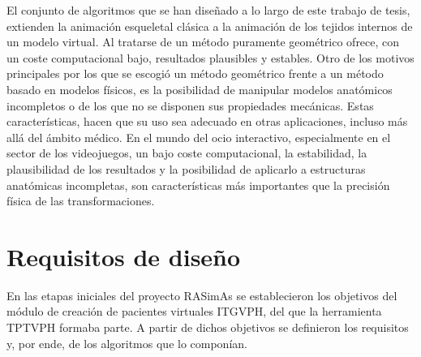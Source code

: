 El conjunto de algoritmos que se han diseñado a lo largo de este trabajo de tesis, extienden la animación esqueletal clásica a la animación de los tejidos internos de un modelo virtual. Al tratarse de un método puramente geométrico ofrece, con un coste computacional bajo, resultados plausibles y estables. Otro de los motivos principales por los que se escogió un método geométrico frente a un método basado en modelos físicos, es la posibilidad de manipular modelos anatómicos incompletos o de los que no se disponen sus propiedades mecánicas. Estas características, hacen que su uso sea adecuado en otras aplicaciones, incluso más allá del ámbito médico.  En el mundo del ocio interactivo, especialmente en el sector de los videojuegos, un bajo coste computacional, la estabilidad, la plausibilidad de los resultados y la posibilidad de aplicarlo a estructuras anatómicas incompletas, son características más importantes que la precisión física de las transformaciones. 


\section{Requisitos de diseño}
\label{posing:req}

En las etapas iniciales del proyecto \ac{RASimAs} se establecieron los objetivos del módulo de creación de pacientes virtuales \ac{ITGVPH}, del que la herramienta \ac{TPTVPH} formaba parte. A partir de dichos objetivos se definieron los requisitos y, por ende, de los algoritmos que lo componían.



